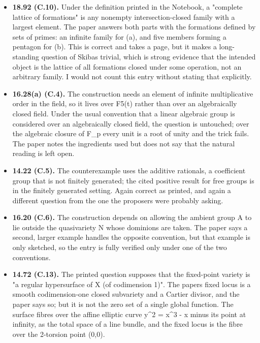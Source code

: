 \begin{itemize}
\tightlist
\item
  \textbf{18.92 (C.10).} Under the definition printed in the Notebook, a
  "complete lattice of formations" is any nonempty intersection-closed
  family with a largest element. The paper answers both parts with the
  formations defined by sets of primes: an infinite family for (a), and
  five members forming a pentagon for (b). This is correct and takes a
  page, but it makes a long-standing question of Skiba\textquotesingle s
  trivial, which is strong evidence that the intended object is the
  lattice of all formations closed under some operation, not an
  arbitrary family. I would not count this entry without stating that
  explicitly.
\item
  \textbf{16.28(a) (C.4).} The construction needs an element of infinite
  multiplicative order in the field, so it lives over F5(t) rather than
  over an algebraically closed field. Under the usual convention that a
  linear algebraic group is considered over an algebraically closed
  field, the question is untouched; over the algebraic closure of F\_p
  every unit is a root of unity and the trick fails. The paper notes the
  ingredients used but does not say that the natural reading is left
  open.
\item
  \textbf{14.22 (C.5).} The counterexample uses the additive rationals,
  a coefficient group that is not finitely generated; the cited positive
  result for free groups is in the finitely generated setting. Again
  correct as printed, and again a different question from the one the
  proposers were probably asking.
\item
  \textbf{16.20 (C.6).} The construction depends on allowing the ambient
  group A to lie outside the quasivariety N whose dominions are taken.
  The paper says a second, larger example handles the opposite
  convention, but that example is only sketched, so the entry is fully
  verified only under one of the two conventions.
\item
  \textbf{14.72 (C.13).} The printed question supposes that the
  fixed-point variety is "a regular hypersurface of X (of codimension
  1)". The paper\textquotesingle s fixed locus is a smooth
  codimension-one closed subvariety and a Cartier divisor, and the paper
  says so; but it is not the zero set of a single global function. The
  surface fibres over the affine elliptic curve y\^{}2 = x\^{}3 - x
  minus its point at infinity, as the total space of a line bundle, and
  the fixed locus is the fibre over the 2-torsion point (0,0).

\end{itemize}
